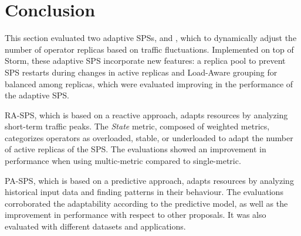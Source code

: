 \section{Conclusion}
This section evaluated two adaptive SPSs, \rSPS{} and \pSPS{}, which to dynamically adjust the number of operator replicas based on traffic fluctuations. Implemented on top of Storm, these adaptive SPS incorporate new features: a replica pool to prevent SPS restarts during changes in active replicas and Load-Aware grouping for balanced among replicas, which were evaluated improving in the performance of the adaptive SPS.

RA-SPS, which is based on a reactive approach, adapts resources by analyzing short-term traffic peaks. The \textit{State} metric, composed of weighted metrics, categorizes operators as overloaded, stable, or underloaded to adapt the number of active replicas of the SPS. The evaluations showed an improvement in performance when using multic-metric compared to single-metric.

PA-SPS, which is based on a predictive approach, adapts resources by analyzing historical input data and finding patterns in their behaviour. The evaluations corroborated the adaptability according to the predictive model, as well as the improvement in performance with respect to other proposals. It was also evaluated with different datasets and applications.